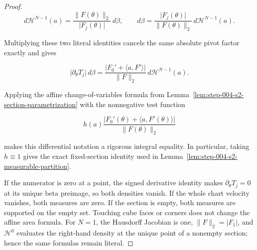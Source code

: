 \begin{proof}
\begin{equation}
\label{eq:appendix-display-127}
d\mathcal H^{N-1}(a)
=\frac{\lVert F(\theta)\rVert_2}{\lvert F_j(\theta)\rvert}\,d\beta,
\qquad
d\beta
=\frac{\lvert F_j(\theta)\rvert}{\lVert F(\theta)\rVert_2}
\,d\mathcal H^{N-1}(a).
\end{equation}

Multiplying these two literal identities cancels the same absolute pivot factor exactly and gives

\begin{equation}
\label{eq:appendix-display-128}
\lvert\partial_\theta T_j\rvert\,d\beta
=
\frac{\lvert F_0'+\langle a,F'\rangle\rvert}{\lVert F\rVert_2}
\,d\mathcal H^{N-1}(a).
\end{equation}

Applying the affine change-of-variables formula from
Lemma~\ref{lem:step-004-s2-section-parametrization} with the nonnegative test function

\begin{equation}
\label{eq:appendix-display-129}
h(a)\frac{\lvert F_0'(\theta)+\langle a,F'(\theta)\rangle\rvert}
{\lVert F(\theta)\rVert_2}
\end{equation}

makes this differential notation a rigorous integral equality. In particular, taking \(h\equiv1\)
gives the exact fixed-section identity used in Lemma~\ref{lem:step-004-s2-measurable-partition}.

If the numerator is zero at a point, the signed derivative identity makes
\(\partial_\theta T_j=0\) at its unique beta preimage, so both densities vanish. If the whole chart velocity
vanishes, both measures are zero. If the section is empty, both measures are supported on the empty set.
Touching cube faces or corners does not change the affine area formula. For \(N=1\), the Hausdorff Jacobian is
one, \(\lVert F\rVert_2=\lvert F_1\rvert\), and \(\mathcal H^0\) evaluates the right-hand density at the unique
point of a nonempty section; hence the same formulas remain literal. 
\end{proof}

